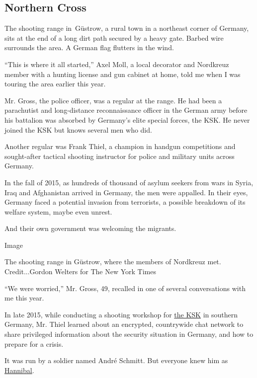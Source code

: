 \hypertarget{northern-cross}{%
\subsection{Northern Cross}\label{northern-cross}}

The shooting range in~Güstrow, a rural town in a northeast corner of
Germany, sits at the end of a long dirt path secured by a heavy gate.
Barbed wire surrounds the area. A German flag flutters in the wind.

``This is where it all started,'' Axel Moll, a local decorator and
Nordkreuz member with a hunting license and gun cabinet at home, told me
when I was touring the area earlier this year.

Mr. Gross, the police officer, was a regular at the range. He had been a
parachutist and long-distance reconnaissance officer in the German army
before his battalion was absorbed by Germany's elite special forces, the
KSK. He never joined the KSK but knows several men who did.

Another regular was Frank Thiel, a champion in handgun competitions and
sought-after tactical shooting instructor for police and military units
across Germany.

In the fall of 2015, as hundreds of thousand of asylum seekers from wars
in Syria, Iraq and Afghanistan arrived in Germany, the men were
appalled. In their eyes, Germany faced a potential invasion from
terrorists, a possible breakdown of its welfare system, maybe even
unrest.

And their own government was welcoming the migrants.

Image

The shooting range in Güstrow, where the members of Nordkreuz met.
Credit...Gordon Welters for The New York Times

``We were worried,'' Mr. Gross, 49, recalled in one of several
conversations with me this year.

In late 2015, while conducting a shooting workshop for
\href{https://www.nytimes.com/2020/07/03/world/europe/germany-military-neo-nazis-ksk.html?searchResultPosition=2}{the
KSK} in southern Germany, Mr. Thiel learned about an encrypted,
countrywide chat network to share privileged information about the
security situation in Germany, and how to prepare for a crisis.

It was run by a soldier named André Schmitt. But everyone knew him as
\href{https://www.nytimes.com/2020/07/03/world/europe/germany-military-neo-nazis-ksk.html?searchResultPosition=1}{Hannibal}.

